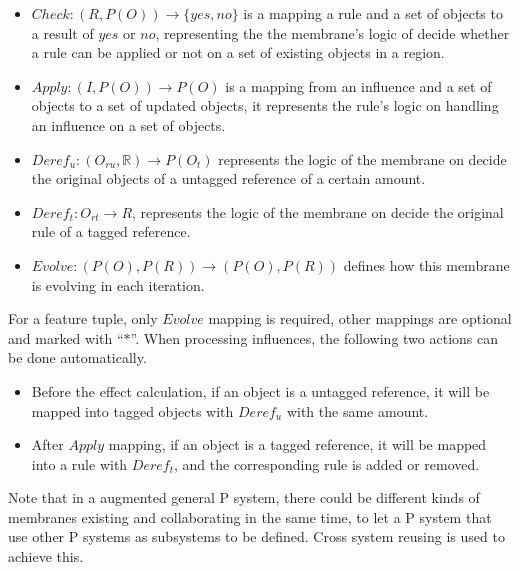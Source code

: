 \documentclass[9pt,a4paper,twoside]{article}
\begin{document}
        
            \begin{itemize}
                \item  $Check: (R, P(O)) \rightarrow \{yes, no\}$ is a mapping a rule and a set of objects to a result of $yes$ or $no$, representing the
                the membrane's logic of decide whether a rule can be applied or not on a set of existing objects in a region.
                
                \item  $Apply: (I, P(O)) \rightarrow P(O)$ is a mapping from an influence and a set of objects to a set of updated objects,
                it represents the rule's logic on handling an influence on a set of objects.
        
                \item $Deref_u: (O_{ru}, \mathbb{R}) \rightarrow P(O_t)$ represents the logic of the membrane on decide the original objects of a untagged reference
                of a certain amount. 
                
                \item $Deref_t: O_{rt} \rightarrow R$, represents the logic of the membrane on decide the original rule of a tagged reference.
        
                \item $Evolve: (P(O), P(R)) \rightarrow (P(O), P(R))$ defines how this membrane is evolving in each iteration.
        
            \end{itemize}
        
                For a feature tuple, only $Evolve$ mapping is required, other mappings are optional and marked with ``$*$''.
                When processing influences, the following two actions can be done automatically.
                
            \begin{itemize}
                \item Before the effect calculation, if an object is a untagged reference, it will be mapped into tagged objects with $Deref_u$ with the same amount.
                \item After $Apply$ mapping, if an object is a tagged reference, it will be mapped into a rule with $Deref_t$, and the corresponding rule is added or removed. 
            \end{itemize}
        
            Note that in a augmented general P system, there could be different kinds of membranes existing and collaborating in the same time, to let a P system that use other P systems as subsystems to be defined. Cross system reusing is used to achieve this.
\end{document}

